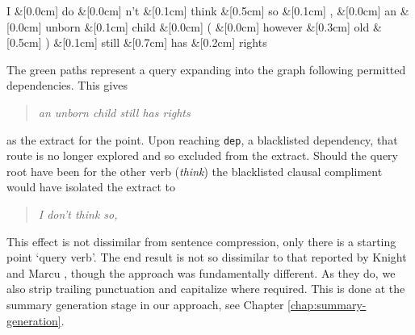     \begin{center}
      \begin{dependency}[edge horizontal padding=0]
        \begin{deptext}
          I \&[0.0cm] do \&[0.0cm] n't \&[0.1cm] think \&[0.5cm] so \&[0.1cm] , \&[0.0cm] an \&[0.0cm] unborn \&[0.1cm] child \&[0.0cm] ( \&[0.0cm] however \&[0.3cm] old \&[0.5cm] ) \&[0.1cm] still \&[0.7cm] has \&[0.2cm] rights \\
        \end{deptext}





      \end{dependency}
    \end{center}

    The green paths represent a query expanding into the graph following permitted dependencies. This gives \blockquote{\textit{an unborn child still has rights}} as the extract for the point. Upon reaching \texttt{dep}, a blacklisted dependency, that route is no longer explored and so excluded from the extract. Should the query root have been for the other verb (\textit{think}) the blacklisted clausal compliment would have isolated the extract to \blockquote{\textit{I don't think so,}}.

    This effect is not dissimilar from sentence compression, only there is a starting point `query verb'. The end result is not so dissimilar to that reported by Knight and Marcu \cite{knight2000statistics}, though the approach was fundamentally different. As they do, we also strip trailing punctuation and capitalize where required. This is done at the summary generation stage in our approach, see Chapter \ref{chap:summary-generation}.

